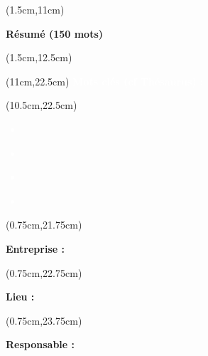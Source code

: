 \begin{titlepage}
    \begin{textblock*}{18cm}(1.5cm,11cm)
        \begin{center}
            \normalsize
            \textbf{\textcolor{bleuRoiUTT}{Résumé (150 mots)}}
        \end{center}
    \end{textblock*}

    \begin{textblock*}{18cm}(1.5cm,12.5cm)
        {
            \normalsize
            \makeatletter
            \setlength{\parindent}{0pt}
            \titletext
        }
    \end{textblock*}

    \begin{textblock*}{9cm}(11cm,22.5cm)
        \normalsize
        \centering
        \textbf{\textcolor{white}{Mots clés (cf Thésaurus) :}}
    \end{textblock*}

    \begin{textblock*}{10cm}(10.5cm,22.5cm)
        \small
        \textcolor{white}{
            \begin{itemize}[label=\textcolor{white}{\textbullet}]
                \item \textbf{\theKone}
                \item \textbf{\theKtwo}
                \item \textbf{\theKthree}
                \item \textbf{\theKfourth}
            \end{itemize}
        }
    \end{textblock*}

    \begin{textblock*}{8.5cm}(0.75cm,21.75cm)
        \normalsize
        \raggedright
        \justify
        \textbf{\textcolor{bleuRoiUTT}{Entreprise :} \theEntreprise}
    \end{textblock*}

    \begin{textblock*}{8.5cm}(0.75cm,22.75cm)
        \normalsize
        \raggedright
        \justify
        \textbf{\textcolor{bleuRoiUTT}{Lieu :} \textit{\mapAddr{\theLieu}}}
    \end{textblock*}

    \begin{textblock*}{8.5cm}(0.75cm,23.75cm)
        \normalsize
        \raggedright
        \justify
        \textbf{\textcolor{bleuRoiUTT}{Responsable :} \theREntre}
    \end{textblock*}

\end{titlepage}

\clearpage %